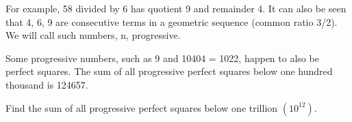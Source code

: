 For example, 58 divided by 6 has quotient 9 and remainder 4. It can also be seen that 4, 6, 9 are consecutive terms in a geometric sequence (common ratio 3/2).
We will call such numbers, n, progressive.

Some progressive numbers, such as 9 and 10404 = 1022, happen to also be perfect squares.
The sum of all progressive perfect squares below one hundred thousand is 124657.

Find the sum of all progressive perfect squares below one trillion $(10^12)$.


\section{} \label{pb.0142}


\section{} \label{pb.0143}


\section{} \label{pb.0144}


\section{} \label{pb.0145}


\section{} \label{pb.0146}


\section{} \label{pb.0147}


\section{} \label{pb.0148}


\section{} \label{pb.0149}


\section{} \label{pb.0150}


